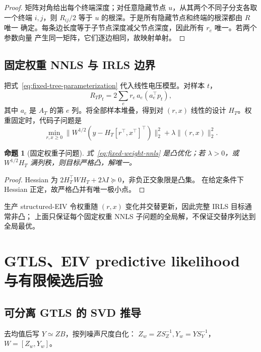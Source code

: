 \documentclass[UTF8,11pt]{ctexart}
\newtheorem{proposition}[definition]{命题}
\begin{document}
\begin{proof}
矩阵对角给出每个终端深度；对任意隐藏节点 $u$，从其两个不同子分支各取一个终端
$i,j$，则 $R_{ij}/2$ 等于 $u$ 的根深。于是所有隐藏节点和终端的根深都由 $R$ 唯一
确定。每条边长度等于子节点深度减父节点深度，因此所有 $r_e$ 唯一。若两个参数向量
产生同一矩阵，它们逐边相同，故映射单射。
\end{proof}

\subsection{固定权重 NNLS 与 IRLS 边界}

把式~\eqref{eq:fixed-tree-parameterization} 代入线性电压模型。对样本 $t$，
\begin{equation*}
 R_Tp_t=2\sum_e r_e\,a_e(a_e^\top p_t),
\end{equation*}
其中 $a_e$ 是 $A_T$ 的第 $e$ 列。将全部样本堆叠，得到对 $(r,x)$ 线性的设计
$H_T$。权重固定时，代码子问题是
\begin{equation}
 \min_{r,x\ge0}\|W^{1/2}(y-H_T[r^\top,x^\top]^\top)\|_2^2
 +\lambda\|(r,x)\|_2^2.
 \label{eq:fixed-weight-nnls}
\end{equation}

\begin{proposition}[固定权重子问题]
式~\eqref{eq:fixed-weight-nnls} 是凸优化；若 $\lambda>0$，或
$W^{1/2}H_T$ 满列秩，则目标严格凸，解唯一。
\end{proposition}

\begin{proof}
Hessian 为 $2H_T^\top WH_T+2\lambda I\succeq0$，非负正交象限是凸集。
在给定条件下 Hessian 正定，故严格凸并有唯一极小点。
\end{proof}

生产 structured-EIV 令权重随 $(r,x)$ 变化并交替更新，因此完整 IRLS 目标通常非凸；
上面只保证每个固定权重 NNLS 子问题的全局解，不保证交替序列达到全局最优。

\section{GTLS、EIV predictive likelihood 与有限候选后验}

\subsection{可分离 GTLS 的 SVD 推导}

去均值后写 $Y\simeq ZB$，按列噪声尺度白化：
$Z_w=ZS_Z^{-1},Y_w=YS_Y^{-1}$，$W=[Z_w,Y_w]$。
\end{document}
